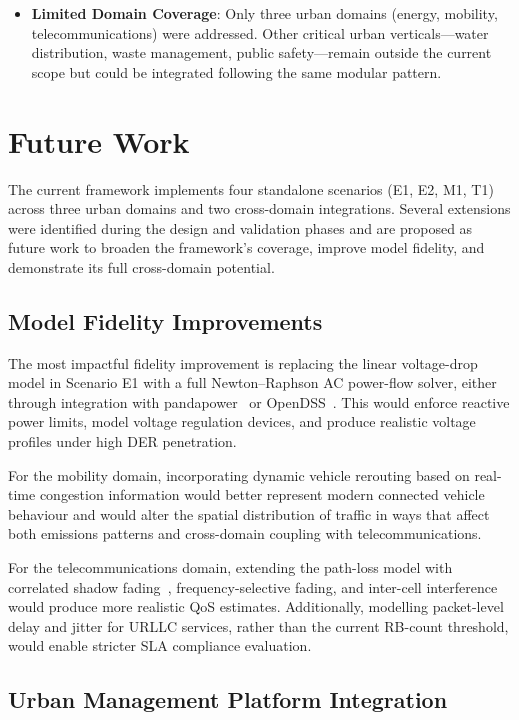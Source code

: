 \begin{itemize}
    \item \textbf{Limited Domain Coverage}: Only three urban domains (energy, mobility, telecommunications) were addressed. Other critical urban verticals---water distribution, waste management, public safety---remain outside the current scope but could be integrated following the same modular pattern.
\end{itemize}


\section{Future Work}

The current framework implements four standalone scenarios (E1, E2, M1, T1) across three urban domains and two cross-domain integrations. Several extensions were identified during the design and validation phases and are proposed as future work to broaden the framework's coverage, improve model fidelity, and demonstrate its full cross-domain potential.

\subsection{Model Fidelity Improvements}

The most impactful fidelity improvement is replacing the linear voltage-drop model in Scenario E1 with a full Newton--Raphson AC power-flow solver, either through integration with pandapower~\cite{pandapower} or OpenDSS~\cite{opendss}. This would enforce reactive power limits, model voltage regulation devices, and produce realistic voltage profiles under high DER penetration.

For the mobility domain, incorporating dynamic vehicle rerouting based on real-time congestion information would better represent modern connected vehicle behaviour and would alter the spatial distribution of traffic in ways that affect both emissions patterns and cross-domain coupling with telecommunications.

For the telecommunications domain, extending the path-loss model with correlated shadow fading~\cite{3gpp_38901}, frequency-selective fading, and inter-cell interference would produce more realistic QoS estimates. Additionally, modelling packet-level delay and jitter for URLLC services, rather than the current RB-count threshold, would enable stricter SLA compliance evaluation.

\subsection{Urban Management Platform Integration}
\label{sec:fw-ump-integration}

